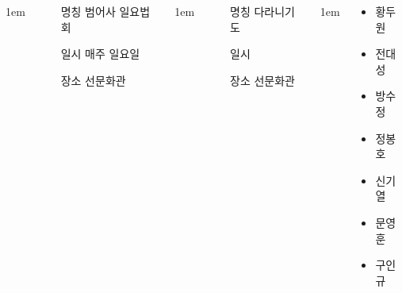 \documentclass[	20pt, 
							a1paper, 
							portrait, %
							margin=0mm, %
							innermargin=10mm,  		%
							colspace=5mm, 
							subcolspace=0mm
							]{tikzposter}
\begin{document}
\begin{columns}


			{
					\setlength{\leftmargini}{4em}
					\setlength{\labelsep} {1em}
				\begin{LARGE}
					\begin{itemize}
					\item [명칭] 범어사 일요법회
					\item [일시] 매주 일요일
					\item [장소] 선문화관
					\end{itemize}
				\end{LARGE}
			}



			{
					\setlength{\leftmargini}{4em}
					\setlength{\labelsep} {1em}
				\begin{LARGE}
					\begin{itemize}
					\item [명칭] 다라니기도
					\item [일시] 
					\item [장소] 선문화관
					\end{itemize}
				\end{LARGE}
			}


			{
					\setlength{\leftmargini}{4em}
					\setlength{\labelsep} {1em}
				\begin{LARGE}
					\begin{itemize}
					\item  황두원 
					\item  전대성 
					\item  방수정 
					\item  정봉호 
					\item  신기열 
					\item  문영훈 
					\item  구인규 
					\end{itemize}
				\end{LARGE}
			} %



	\end{columns}
\end{document}
